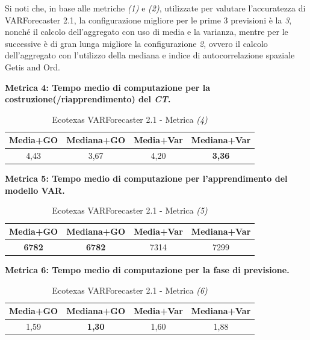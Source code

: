 \documentclass[12pt,a4paper,oneside,openright]{book}
\begin{document}
\medskip

Si noti che, in base alle metriche \textit{(1)} e \textit{(2)}, utilizzate per valutare l'accuratezza di VARForecaster 2.1, la configurazione migliore per le prime 3 previsioni è la \textit{3}, nonché il calcolo dell'aggregato con uso di media e la varianza, mentre per le successive è di gran lunga migliore la configurazione \textit{2}, ovvero il calcolo dell'aggregato con l'utilizzo della mediana e indice di autocorrelazione spaziale Getis and Ord.

\medskip

\textbf{Metrica 4: Tempo medio di computazione per la costruzione(/riapprendimento) del \textit{CT}.}

\medskip


\begin{table}[H]
\centering
\begin{tabular}[H]{|c|c|c|c|}
\hline
\textbf{Media+GO} & \textbf{Mediana+GO} & \textbf{Media+Var} & \textbf{Mediana+Var} \\
\hline
4,43 & 3,67 & 4,20 & \textbf{3,36} \\
\hline
\end{tabular}
\caption{Ecotexas VARForecaster 2.1 - Metrica \textit{(4)}}
\end{table} 

\medskip 
\textbf{Metrica 5: Tempo medio di computazione per l'apprendimento del modello VAR.}

\medskip

\begin{table}[H]
\centering
\begin{tabular}[H]{|c|c|c|c|}
\hline
\textbf{Media+GO} & \textbf{Mediana+GO} & \textbf{Media+Var} & \textbf{Mediana+Var} \\
\hline
\textbf{6782} & \textbf{6782} & 7314 & 7299 \\
\hline
\end{tabular}
\caption{Ecotexas VARForecaster 2.1 - Metrica \textit{(5)}}
\end{table} 

\medskip 
\textbf{Metrica 6: Tempo medio di computazione per la fase di previsione.}

\medskip


\begin{table}[H]
\centering
\begin{tabular}[H]{|c|c|c|c|}
\hline
\textbf{Media+GO} & \textbf{Mediana+GO} & \textbf{Media+Var} & \textbf{Mediana+Var} \\
\hline
1,59 & \textbf{1,30} & 1,60 & 1,88 \\
\hline
\end{tabular}
\caption{Ecotexas VARForecaster 2.1 - Metrica \textit{(6)}}
\end{table} 
\end{document}

